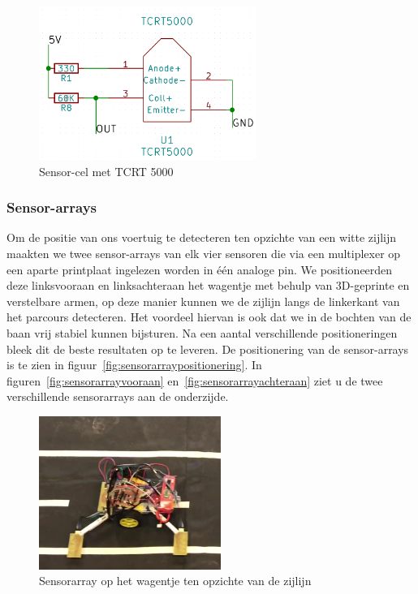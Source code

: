 \begin{figure}[H]
	\centering
	\includegraphics[height=5cm]{tcrt5000cel.png}
	\caption{Sensor-cel met TCRT 5000\label{fig:tcrt5000cel}}
\end{figure}

\subsubsection*{Sensor-arrays}
Om de positie van ons voertuig te detecteren ten opzichte van een witte zijlijn maakten we twee sensor-arrays van elk vier sensoren die via een multiplexer op een aparte printplaat ingelezen worden in \'e\'en analoge pin. We positioneerden deze linksvooraan en linksachteraan het wagentje met behulp van 3D-geprinte en verstelbare armen, op deze manier kunnen we de zijlijn langs de linkerkant van het parcours detecteren. Het voordeel hiervan is ook dat we in de bochten van de baan vrij stabiel kunnen bijsturen. Na een aantal verschillende positioneringen bleek dit de beste resultaten op te leveren. De positionering van de sensor-arrays is te zien in figuur~\vref{fig:sensorarraypositionering}. In figuren~\vref{fig:sensorarrayvooraan} en~\vref{fig:sensorarrayachteraan} ziet u de twee verschillende sensorarrays aan de onderzijde.

\begin{figure}[H]
	\centering
	\includegraphics[height=5cm]{sensorarraypositionering.png}
	\caption{Sensorarray op het wagentje ten opzichte van de zijlijn\label{fig:sensorarraypositionering}}
\end{figure}

